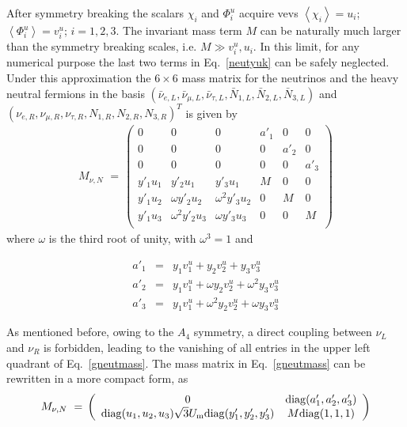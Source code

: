 \documentclass[english,10pt,aps,prd,a4paper,preprintnumbers,floatfix,nofootinbib,showpacs,superscriptaddress]{revtex4-1}
\def\vev#1{\left\langle #1\right\rangle}
\def\vev#1{\left\langle #1\right\rangle}
\def\vev#1{\left\langle #1\right\rangle}
\begin{document}
After symmetry breaking the scalars $\chi_i$ and $\Phi^u_i$ acquire
vevs $\vev{ \chi_i} = u_i$; $\vev{ \Phi^u_i} = v_i^u$; $i = 1, 2, 3$.
 The invariant mass term $M$ can be naturally much larger than the
 symmetry breaking scales, i.e.  $ M \gg v^u_i, u_i$. In this limit,
 for any numerical purpose the last two terms in Eq.~\ref{neutyuk} can
 be safely neglected. Under this approximation the $6\times 6$ mass
 matrix for the neutrinos and the heavy neutral fermions in the basis
 $( \bar{\nu}_{e,L}, \bar{\nu}_{\mu,L}, \bar{\nu}_{\tau,L},
 \bar{N}_{1,L}, \bar{N}_{2,L}, \bar{N}_{3,L} )$
 and
 $( \nu_{e,R}, \nu_{\mu,R}, \nu_{\tau,R}, N_{1,R}, N_{2,R}, N_{3,R}
 )^T$ is given by
  \begin{eqnarray}
   M_{\nu, N} \, \, = \, \left( 
\begin{array}{cccccc}
0           & 0                   &  0                  & a'_1	 	& 0            &   0      \\
0           & 0                   &  0                  & 0	        & a'_2	       &   0       \\
0           & 0                   &  0                  & 0	 	& 0	       &   a'_3    \\ 
y'_1 u_1    & y'_2 u_1            &  y'_3 u_1           & M             & 0	       &  0	    \\
y'_1 u_2    & \omega y'_2 u_2     & \omega^2 y'_3 u_2   & 0		& M            &  0	    \\
y'_1 u_3    & \omega^2 y'_2 u_3   & \omega y'_3 u_3     & 0		& 0	       &  M         \\
\end{array}
\right)
   \label{gneutmass}
  \end{eqnarray}
 where $\omega$ is the third root of unity, with $\omega^3 = 1$ and
 
   \begin{eqnarray}
   a'_1 & = & y_1 v_1^u  +  y_2 v_2^u  +  y_3 v_3^u \nonumber \\
   a'_2 &=&   y_1 v_1^u + \omega y_2 v_2^u + \omega^2y_3 v_3^u \nonumber \\
   a'_3 &=& y_1 v_1^u + \omega^2y_2 v_2^u +\omega y_3 v_3^u
  \end{eqnarray}
 
  As mentioned before, owing to the $A_4$ symmetry, a direct
    coupling between $\nu_L$ and $\nu_R$ is forbidden, leading to
    the vanishing of all entries in the upper left quadrant of
    Eq.~\ref{gneutmass}.  The mass matrix in Eq.~\ref{gneutmass} can
  be rewritten in a more compact form, as
  \begin{eqnarray}
   M_{\nu, N} \, \, = \, \left( 
\begin{array}{cc}
0     		     &\mathrm{diag}(a'_1, a'_2, a'_3)            \\
\mathrm{diag}(u_1, u_2, u_3) \sqrt{3}U_{\rm m}\mathrm{diag}(y'_1,y'_2,y'_3)    & M \mathrm{diag}(1,1,1)  \\
\end{array}
\right)
   \label{gneutmasscompact}
  \end{eqnarray}
  
\end{document}
